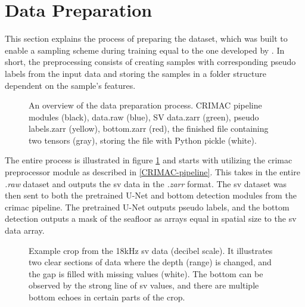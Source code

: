         
    \section{Data Preparation}
        This section explains the process of preparing the dataset, which was built to enable a sampling scheme during training equal to the one developed by \citeauthor{brautaset2020acoustic}\cite{brautaset2020acoustic}. In short, the preprocessing consists of creating samples with corresponding pseudo labels from the input data and storing the samples in a folder structure dependent on the sample's features.
        
        \clearpage
        \begin{figure}[H]
            \centering
            
            \caption[Data preparation process]{An overview of the data preparation process. CRIMAC pipeline modules (black), data.raw (blue), SV data.zarr (green), pseudo labels.zarr (yellow), bottom.zarr (red), the finished file containing two tensors (gray), storing the file with Python pickle (white).}
          	\medskip 
            \label{data_generation_flowchart_fig}
        \end{figure}
        
        The entire process is illustrated in figure \ref{data_generation_flowchart_fig} and starts with utilizing the \gls{crimac} preprocessor module as described in \ref{CRIMAC-pipeline}. This takes in the entire \textit{.raw} dataset and outputs the \gls{sv} data in the \textit{.zarr} format. The \gls{sv} dataset was then sent to both the pretrained U-Net and bottom detection modules from the \gls{crimac} pipeline. The pretrained U-Net outputs pseudo labels, and the bottom detection outputs a mask of the seafloor as arrays equal in spatial size to the \gls{sv} data array.
        
        \begin{figure}[H]
            \centering
            
            \caption[Missing values and bottom]{Example crop from the 18kHz \gls{sv} data (decibel scale). It illustrates two clear sections of data where the depth (range) is changed, and the gap is filled with missing values (white). The bottom can be observed by the strong line of \gls{sv} values, and there are multiple bottom echoes in certain parts of the crop.}
          	\medskip 
            \label{data_bottom_nans_fig}
        \end{figure}
        
